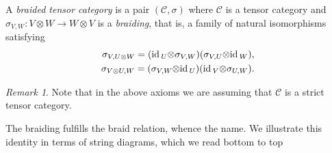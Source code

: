 \documentclass[11pt]{amsart}
\newcommand{\ot}{{\otimes}}
\newcommand{\vc}{{\mathcal C}}
\newcommand{\id}{\mbox{\rm id\,}}
\renewcommand{\_}[1]{\mbox{$_{\left( #1 \right)}$}}
\theoremstyle{plain}
\numberwithin{equation}{section}
\theoremstyle{definition}
\theoremstyle{remark}
\newtheorem{rmk}[teo]{Remark}
\theoremstyle{introTheorems}
\begin{document}
\medbreak


A \textit{braided tensor category} is a pair $(\vc,\sigma)$ where $\vc$ is a tensor category and $\sigma_{V,W}:V\ot W\to W\ot V$ is a \textit{braiding}, that is, a family of natural isomorphisms satisfying
\begin{equation}\label{braiding1}\begin{split} \sigma_{V,U\ot W}=(\id_U\ot \sigma_{V,W})(\sigma_{V,U}\ot\id_W),\\
\sigma_{V\ot U, W}=(\sigma_{V,W}\ot\id_U) (\id_V\ot \sigma_{U,W}).
\end{split}
\end{equation}
\begin{rmk} Note that in the above axioms we are assuming that $\vc$ is a strict tensor category. 
\end{rmk}
The braiding fulfills the braid relation, whence the name. We illustrate this identity in terms of string diagrams, which we read bottom to top
\end{document}
